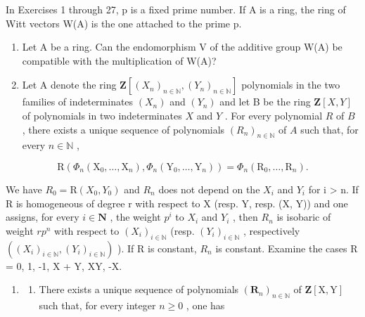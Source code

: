 
In Exercises 1 through 27, p is a fixed prime number. If A is a ring, the ring of Witt vectors W(A) is the one attached to the prime p.

\begin{enumerate}
\def\labelenumi{\arabic{enumi})}
\item
  Let A be a ring. Can the endomorphism V of the additive group W(A) be compatible with the multiplication of W(A)?
\item
  Let A denote the ring \(\mathbf{Z}[(X_n)_{n\in\mathbb{N}}, (Y_n)_{n\in\mathbb{N}}]\) polynomials in the two families of indeterminates \((X_n)\) and \((Y_n)\) and let B be the ring \(\mathbf{Z}[X, Y]\) of polynomials in two indeterminates \(X\) and \(Y\) . For every polynomial \(R\) of \(B\) , there exists a unique sequence of polynomials \((R_n)_{n\in\mathbb{N}}\) of \(A\) such that, for every \(n\in\mathbb{N}\) ,
\end{enumerate}

\[
\mathrm{R} \left(\Phi_ {n} \left(\mathrm{X} _ {0}, \dots , \mathrm{X} _ {n}\right), \Phi_ {n} \left(\mathrm{Y} _ {0}, \dots , \mathrm{Y} _ {n}\right)\right) = \Phi_ {n} \left(\mathrm{R} _ {0}, \dots , \mathrm{R} _ {n}\right).
\]

We have \(R_{0} = \mathrm{R}(X_{0}, Y_{0})\) and \(R_{n}\) does not depend on the \(X_{i}\) and \(Y_{i}\) for i \textgreater{} n. If R is homogeneous of degree r with respect to X (resp. Y, resp. (X, Y)) and one assigns, for every \(i \in \mathbf{N}\) , the weight \(p^{i}\) to \(X_{i}\) and \(Y_{i}\) , then \(R_{n}\) is isobaric of weight \(rp^{n}\) with respect to \((X_{i})_{i \in \mathbb{N}}\) (resp. \((Y_{i})_{i \in \mathbb{N}}\) , respectively \(((X_{i})_{i \in \mathbb{N}}, (Y_{i})_{i \in \mathbb{N}})\) ). If R is constant, \(R_{n}\) is constant. Examine the cases R = 0, 1, -1, X + Y, XY, -X.

\begin{enumerate}
\def\labelenumi{\arabic{enumi})}
\setcounter{enumi}{2}
\tightlist
\item
  \begin{enumerate}
  \def\labelenumii{\alph{enumii})}
  \tightlist
  \item
    There exists a unique sequence of polynomials \((\mathbf{R}_n)_{n\in \mathbb{N}}\) of \(\mathbf{Z}[\mathrm{X},\mathrm{Y}]\) such that, for every integer \(n\geqslant 0\) , one has
  \end{enumerate}
\end{enumerate}

